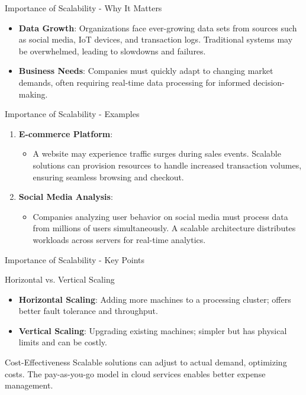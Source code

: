 \documentclass[aspectratio=169]{beamer}
\begin{document}
\begin{frame}[fragile]{Importance of Scalability - Why It Matters}
    \begin{itemize}
        \item \textbf{Data Growth}: Organizations face ever-growing data sets from sources such as social media, IoT devices, and transaction logs. Traditional systems may be overwhelmed, leading to slowdowns and failures.
        \item \textbf{Business Needs}: Companies must quickly adapt to changing market demands, often requiring real-time data processing for informed decision-making.
    \end{itemize}
\end{frame}

\begin{frame}[fragile]{Importance of Scalability - Examples}
    \begin{enumerate}
        \item \textbf{E-commerce Platform}:
            \begin{itemize}
                \item A website may experience traffic surges during sales events. Scalable solutions can provision resources to handle increased transaction volumes, ensuring seamless browsing and checkout.
            \end{itemize}
        \item \textbf{Social Media Analysis}:
            \begin{itemize}
                \item Companies analyzing user behavior on social media must process data from millions of users simultaneously. A scalable architecture distributes workloads across servers for real-time analytics.
            \end{itemize}
    \end{enumerate}
\end{frame}

\begin{frame}[fragile]{Importance of Scalability - Key Points}
    \begin{block}{Horizontal vs. Vertical Scaling}
        \begin{itemize}
            \item \textbf{Horizontal Scaling}: Adding more machines to a processing cluster; offers better fault tolerance and throughput.
            \item \textbf{Vertical Scaling}: Upgrading existing machines; simpler but has physical limits and can be costly.
        \end{itemize}
    \end{block}
    
    \begin{block}{Cost-Effectiveness}
        Scalable solutions can adjust to actual demand, optimizing costs. The pay-as-you-go model in cloud services enables better expense management.
    \end{block}
\end{frame}
\end{document}

